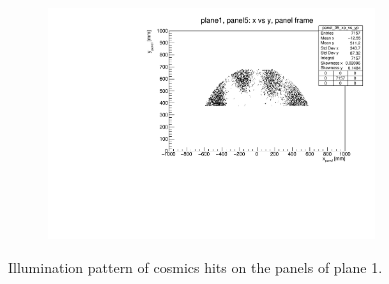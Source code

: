 \begin{figure}[!h]
\begin{subfigure}[b]{0.4\textwidth}
        \label{fig:panel4plane1}
    \end{subfigure}
    \hfill
    \begin{subfigure}[b]{0.4\textwidth}
        \centering
        \includegraphics[width=0.95\textwidth]{figures/pdf/plane1_panel5_x_vs_y_all.pdf}
        \label{fig:panel5plane1}
    \end{subfigure}
       \caption[Plane 1 illumination pattern of cosmic hits.]{Illumination pattern of cosmics hits on the panels of plane 1.}
       \label{fig:plane1}
\end{figure}
